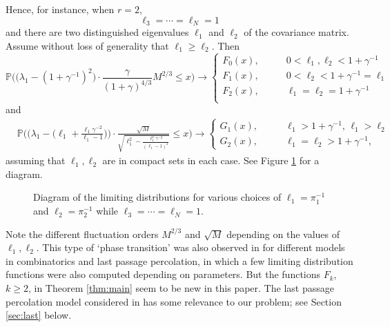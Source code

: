 \documentclass[11pt]{article}
\begin{document}
Hence, for instance, when $r=2$,
\begin{equation}
  \ell_3=\cdots =\ell_N=1
\end{equation}
and there are two distinguished eigenvalues $\ell_1$ and $\ell_2$
of the covariance matrix. Assume without loss of generality that
$\ell_1\ge \ell_2$. Then
\begin{equation}
  \mathbb{P} \biggl( \bigr( \lambda_1 - (1+\gamma^{-1})^2 \bigr) \cdot
  \frac{\gamma}{(1+\gamma)^{4/3}} M^{2/3} \le x \biggr)
  \to \begin{cases}  F_0(x), \qquad &
  0< \ell_1, \ell_2 <1+\gamma^{-1} \\
  F_1(x), \qquad & 0<\ell_2 <1+\gamma^{-1}=\ell_1 \\
  F_2(x), \qquad & \ell_1=\ell_2=1+\gamma^{-1} \\
  \end{cases}
\end{equation}
and
\begin{equation}
\begin{split}
  & \mathbb{P} \biggl( \bigr( \lambda_1 -
  \bigl(\ell_1+\frac{\ell_1\gamma^{-2}}{\ell_1-1}\bigr) \bigr) \cdot
  \frac{\sqrt{M}}{\sqrt{\ell_1^2-\frac{\ell_1^2\gamma^{-2}}{(\ell_1-1)^2}}} \le x
  \biggr)
  \to \begin{cases}
  G_1(x), \qquad & \ell_1 > 1+\gamma^{-1}, \, \ell_1>\ell_2  \\
  G_2(x), \qquad & \ell_1=\ell_2> 1+\gamma^{-1},
  \end{cases}
\end{split}
\end{equation}
assuming that $\ell_1, \ell_2$ are in compact sets in each case.
See Figure \ref{fig:Phasediag} for a diagram.
\begin{figure}[ht]
\centerline{\epsfxsize=8cm}
\caption{Diagram of the limiting distributions for various choices
of $\ell_1=\pi_1^{-1}$ and $\ell_2=\pi_2^{-1}$ while
$\ell_3=\cdots=\ell_N=1$.} \label{fig:Phasediag}
\end{figure}


Note the different fluctuation orders $M^{2/3}$ and $\sqrt{M}$
depending on the values of $\ell_1, \ell_2$. This type of `phase
transition' was also observed in \cite{BR2, BR4, SpohnPCurrent}
for different models in combinatorics and last passage
percolation, in which a few limiting distribution functions were
also computed depending on parameters. But the functions $F_k$,
$k\ge 2$, in Theorem \ref{thm:main} seem to be new in this paper.
The last passage percolation model considered in \cite{BR4,
SpohnPCurrent} has some relevance to our problem; see Section
\ref{sec:last} below.
\end{document}
